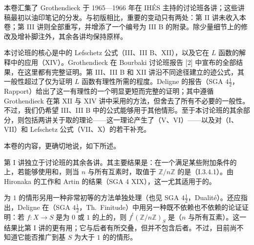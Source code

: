 本卷汇集了 Grothendieck 于 1965—1966 年在 IHÉS 主持的讨论班各讲；这些讲稿最初以油印笔记的分发。与初版相比，重要的变动只有两处：第 II 讲未收入本卷；第 III 讲则全部重写，并增添了一个编号为 III B 的附录。除少量细节上的修改及增补脚注外，其余各讲均保持原样。

本讨论班的核心是中的 Lefschetz 公式（III、III B、XII），以及它在 $L$ 函数的解释中的应用（XIV）。Grothendieck 在 Bourbaki 讨论班报告 [2] 中宣布的全部结果，在这里都有完整证明。第 III、III B 和 XII 讲沿不同途径建立的迹公式，其一般性超过了仅为证明 $L$ 函数有理性所需的程度。Deligne 的报告（SGA $4\frac12$，Rapport）给出了这一有理性的一个明显更短而完整的证明；其中遵循 Grothendieck 在第 XII 与 XIV 讲中采用的方法，但舍去了所有不必要的一般性。不过，我们仍希望 III、III B 中的公式能够用于其他情形。至于本讨论班的其余部分，则包括两讲关于取的理论——这一理论产生了（V、VI）——以及对（I、VII）和 Lefschetz 公式（VII、X）的若干补充。

本卷的内容，更确切地说，如下所述。

第 I 讲独立于讨论班的其余各讲。其主要结果是：在一个满足某些附加条件的上，若能够使用和，则当 $n$ 与所有互素时，取值于 $\mathbb Z/n\mathbb Z$ 的是（I.3.4.1）。由 Hironaka 的工作和 Artin 的结果（SGA 4 XIX），这一尤其适用于的。

为 $1$ 的情形另用一种非常初等的方法单独处理（也见 SGA $4\frac12$，Dualité）。还应指出，Deligne 在（SGA $4\frac12$，Th.~Finitude）中用另一种既不依赖也不依赖的论证证明：若 $f\colon X\longrightarrow S$ 是为 $0$ 或 $1$ 的上的，则 $f^!(\mathbb Z/n\mathbb Z)_S$ 是（$n$ 与所有互素）。这一结果比第 I 讲的更有用；它与后者有所交叠，但并不包含后者。不过，目前尚不知道它能否推广到基 $S$ 为大于 $1$ 的的情形。

